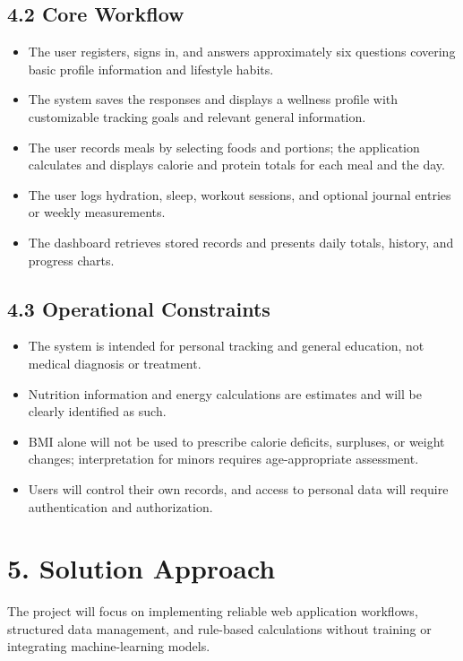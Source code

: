 \documentclass[11pt,a4paper]{article}
\begin{document}
\subsection*{4.2 Core Workflow}
\begin{itemize}
\item The user registers, signs in, and answers approximately six questions covering basic profile information and lifestyle habits.
\item The system saves the responses and displays a wellness profile with customizable tracking goals and relevant general information.
\item The user records meals by selecting foods and portions; the application calculates and displays calorie and protein totals for each meal and the day.
\item The user logs hydration, sleep, workout sessions, and optional journal entries or weekly measurements.
\item The dashboard retrieves stored records and presents daily totals, history, and progress charts.
\end{itemize}
\subsection*{4.3 Operational Constraints}
\begin{itemize}
\item The system is intended for personal tracking and general education, not medical diagnosis or treatment.
\item Nutrition information and energy calculations are estimates and will be clearly identified as such.
\item BMI alone will not be used to prescribe calorie deficits, surpluses, or weight changes; interpretation for minors requires age-appropriate assessment.
\item Users will control their own records, and access to personal data will require authentication and authorization.
\end{itemize}
\section*{5. Solution Approach}
The project will focus on implementing reliable web application workflows, structured data management, and rule-based calculations without training or integrating machine-learning models.
\end{document}
